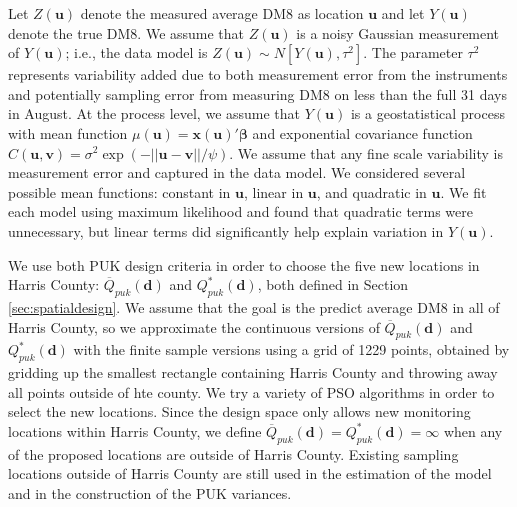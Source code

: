\documentclass[cmbright]{staauth}
\begin{document}
Let $Z(\bm{u})$ denote the measured average DM8 as location $\bm{u}$ and let $Y(\bm{u})$ denote the true DM8. We assume that $Z(\bm{u})$ is a noisy Gaussian measurement of $Y(\bm{u})$; i.e., the data model is $Z(\bm{u}) \sim N[Y(\bm{u}), \tau^2]$. The parameter $\tau^2$ represents variability added due to both measurement error from the instruments and potentially sampling error from measuring DM8 on less than the full 31 days in August. At the process level, we assume that $Y(\bm{u})$ is a geostatistical process with mean function $\mu(\bm{u}) = \bm{x}(\bm{u})'\bm{\beta}$ and exponential covariance function $C(\bm{u},\bm{v}) = \sigma^2\exp(-||\bm{u} - \bm{v}||/\psi)$. We assume that any fine scale variability is measurement error and captured in the data model. We considered several possible mean functions: constant in $\bm{u}$, linear in $\bm{u}$, and quadratic in $\bm{u}$. We fit each model using maximum likelihood and found that quadratic terms were unnecessary, but linear terms did significantly help explain variation in $Y(\bm{u})$.

We use both PUK design criteria in order to choose the five new locations in Harris County: $\overline{Q}_{puk}(\bm{d})$ and $Q^*_{puk}(\bm{d})$, both defined in Section \ref{sec:spatialdesign}. We assume that the goal is the predict average DM8 in all of Harris County, so we approximate the continuous versions of $\overline{Q}_{puk}(\bm{d})$ and $Q^*_{puk}(\bm{d})$ with the finite sample versions using a grid of 1229 points, obtained by gridding up the smallest rectangle containing Harris County and throwing away all points outside of hte county. We try a variety of PSO algorithms in order to select the new locations. Since the design space only allows new monitoring locations within Harris County, we define $\overline{Q}_{puk}(\bm{d})=Q^*_{puk}(\bm{d})=\infty$ when any of the proposed locations are outside of Harris County. Existing sampling locations outside of Harris County are still used in the estimation of the model and in the construction of the PUK variances.
\end{document}
